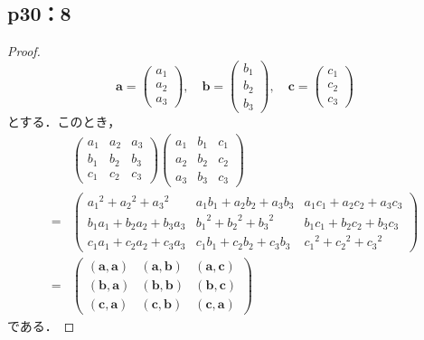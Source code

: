 \documentclass[uplatex,dvipdfmx,a4paper,10pt,fleqn]{jsarticle}
\begin{document}
\subsection*{p30：8}
\begin{tleftbar}
    \begin{proof}
    \[
    \bm{a}=\begin{pmatrix} a_1 \\ a_2 \\ a_3 \end{pmatrix},\quad \bm{b}=\begin{pmatrix} b_1 \\ b_2 \\ b_3 \end{pmatrix},\quad \bm{c}=\begin{pmatrix} c_1 \\ c_2 \\ c_3 \end{pmatrix}
    \]
    とする．このとき，
    \begin{align*}
        &
        \begin{pmatrix}
            a_1 & a_2 & a_3 \\
            b_1 & b_2 & b_3 \\
            c_1 & c_2 & c_3
        \end{pmatrix}
        \begin{pmatrix}
            a_1 & b_1 & c_1 \\
            a_2 & b_2 & c_2 \\
            a_3 & b_3 & c_3
        \end{pmatrix}
        \\
         =& \begin{pmatrix}
            {a_1}^2 +{a_2}^2 +{a_3}^2 & a_1 b_1 + a_2 b_2 + a_3 b_3 & a_1 c_1 + a_2 c_2 + a_3 c_3 \\
            b_1 a_1 + b_2 a_2 + b_3 a_3 & {b_1}^2 +{b_2}^2 + {b_3}^2 & b_1 c_1 + b_2 c_2 + b_3 c_3 \\
            c_1 a_1 + c_2 a_2 + c_3 a_3 & c_1 b_1 + c_2 b_2 + c_3 b_3 & {c_1}^2 +{c_2}^2 +{c_3}^2
        \end{pmatrix}
        \\
        =& \begin{pmatrix}
            (\bm{a},\bm{a}) & (\bm{a},\bm{b}) & (\bm{a},\bm{c}) \\
            (\bm{b},\bm{a}) & (\bm{b},\bm{b}) & (\bm{b},\bm{c}) \\
            (\bm{c},\bm{a}) & (\bm{c},\bm{b}) & (\bm{c},\bm{a})
        \end{pmatrix}
    \end{align*}
    である．


\end{proof}
\end{tleftbar}
\end{document}
